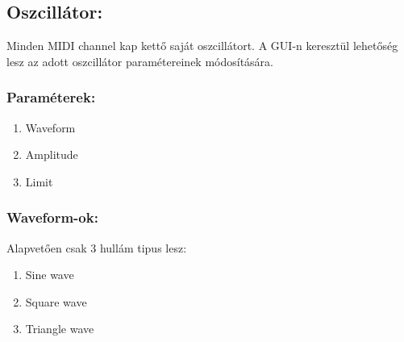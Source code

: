 \documentclass{article}
\begin{document}
\subsection{Oszcillátor:}
Minden MIDI channel kap kettő saját oszcillátort.
A GUI-n keresztül lehetőség lesz az adott oszcillátor
paramétereinek módosítására. 

\subsubsection{Paraméterek:}
\begin{enumerate}
    \item{Waveform}
    \item{Amplitude}
    \item{Limit}
\end{enumerate}

\subsubsection{Waveform-ok:}
Alapvetően csak 3 hullám tipus lesz:
\begin{enumerate}
    \item{Sine wave}
    \item{Square wave}
    \item{Triangle wave}
\end{enumerate}
\end{document}
